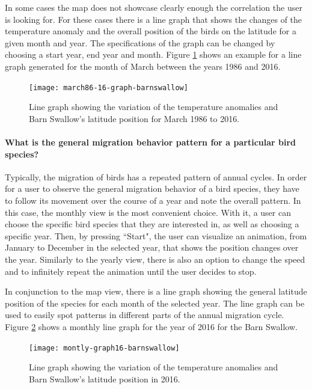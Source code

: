 \documentclass[journal]{vgtc}                %
\begin{document}
In some cases the map does not showcase clearly enough the correlation the user is looking for. For these cases there is a line graph that shows the changes of the temperature anomaly and the overall position of the birds on the latitude for a given month and year. The specifications of the graph can be changed by choosing a start year, end year and month. Figure \ref{fig:march86-16-graph} shows an example for a line graph generated for the month of March between the years 1986 and 2016.

\begin{figure}[h]
  \centering
  \texttt{[image: march86-16-graph-barnswallow]}
  \caption{Line graph showing the variation of the temperature anomalies and Barn Swallow's latitude position for March 1986 to 2016.}
  \label{fig:march86-16-graph}
\end{figure}

\paragraph{What is the general migration behavior pattern for a particular bird species?}

Typically, the migration of birds has a repeated pattern of annual cycles. In order for a user to observe the general migration behavior of a bird species, they have to follow its movement over the course of a year and note the overall pattern. In this case, the monthly view is the most convenient choice. With it, a user can choose the specific bird species that they are interested in, as well as choosing a specific year. Then, by pressing ``Start", the user can visualize an animation, from January to December in the selected year, that shows the position changes over the year. Similarly to the yearly view, there is also an option to change the speed and to infinitely repeat the animation until the user decides to stop.

In conjunction to the map view, there is a line graph showing the general latitude position of the species for each month of the selected year. The line graph can be used to easily spot patterns in different parts of the annual migration cycle. Figure \ref{fig:montly-graph16} shows a monthly line graph for the year of 2016 for the Barn Swallow.

\begin{figure}[h]
  \centering
  \texttt{[image: montly-graph16-barnswallow]}
    \caption{Line graph showing the variation of the temperature anomalies and Barn Swallow's latitude position in 2016.}
  \label{fig:montly-graph16}
\end{figure}
\end{document}
